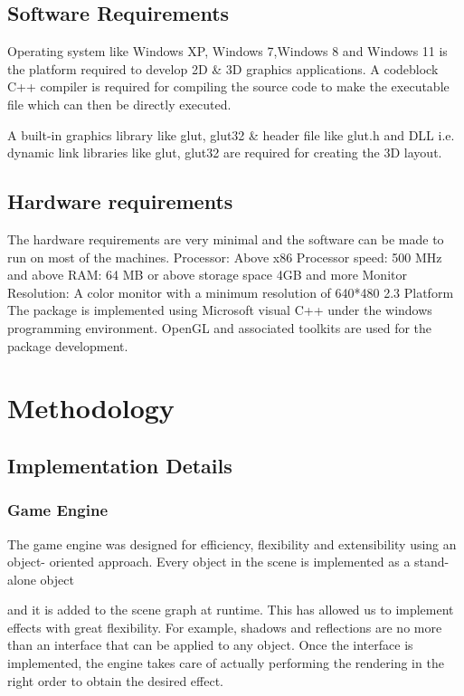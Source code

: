 \documentclass[12pt,a4]{article}
\begin{document}
\subsection{\Large{Software Requirements}}
Operating system like Windows XP, Windows 7,Windows 8 and Windows 11 is the platform required to
develop 2D \& 3D graphics applications.
A codeblock C++ compiler is required for compiling the source code to make the executable file which
can then be directly executed.

A built-in graphics library like glut, glut32 \& header file like glut.h and DLL i.e. dynamic link
libraries like glut, glut32 are required for creating the 3D layout.

\subsection{\Large{Hardware requirements}}
The hardware requirements are very minimal and the software can be made to run on most of the
machines.
Processor: Above x86
Processor speed: 500 MHz and above
RAM: 64 MB or above storage space 4GB and more
Monitor Resolution: A color monitor with a minimum resolution of 640*480
2.3 Platform
The package is implemented using Microsoft visual C++ under the windows programming
environment. OpenGL and associated toolkits are used for the package development.\\

\section{\Huge{Methodology}}
\subsection{\Large{Implementation Details}}
\subsubsection{\large{Game Engine}}
The game engine was designed for efficiency, flexibility and extensibility using an object-
oriented approach. Every object in the scene is implemented as a stand-alone object

and it is added to the scene graph at runtime. This has allowed us to implement effects
with great flexibility. For example, shadows and reflections are no more than an
interface that can be applied to any object. Once the interface is implemented, the
engine takes care of actually performing the rendering in the right order to obtain the
desired effect.
\end{document}
